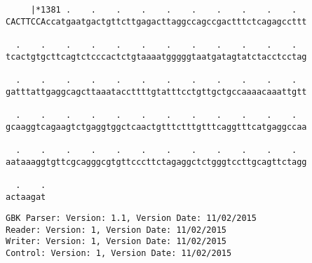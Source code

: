 \documentclass{article}
\begin{document}
\begin{Verbatim}
     |*1381 .    .    .    .    .    .    .    .    .    .  
CACTTCCAccatgaatgactgttcttgagacttaggccagccgactttctcagagccttt
  
  .    .    .    .    .    .    .    .    .    .    .    .  
tcactgtgcttcagtctcccactctgtaaaatgggggtaatgatagtatctacctcctag
  
  .    .    .    .    .    .    .    .    .    .    .    .  
gatttattgaggcagcttaaataccttttgtatttcctgttgctgccaaaacaaattgtt
  
  .    .    .    .    .    .    .    .    .    .    .    .  
gcaaggtcagaagtctgaggtggctcaactgtttctttgtttcaggtttcatgaggccaa
  
  .    .    .    .    .    .    .    .    .    .    .    .  
aataaaggtgttcgcagggcgtgttcccttctagaggctctgggtccttgcagttctagg
  
  .    .
actaagat
\end{Verbatim}
\newpage
\begin{Verbatim}
GBK Parser: Version: 1.1, Version Date: 11/02/2015
Reader: Version: 1, Version Date: 11/02/2015
Writer: Version: 1, Version Date: 11/02/2015
Control: Version: 1, Version Date: 11/02/2015
\end{Verbatim}
\end{document}
